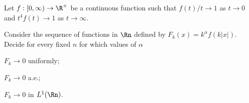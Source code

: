 Let $f:[0,\infty)\rightarrow \R^+$ be a continuous function such that
$f(t)/t\rightarrow 1$ as $t\rightarrow 0$ and $t^4f(t)\rightarrow 1$
as $t\rightarrow \infty$. 

Consider the sequence of functions in $\Rn$ defined by
$F_k(x)=k^{\alpha}f(k|x|)$. Decide for every fixed $n$ for which
values of $\alpha$ 
\begin{alist}
\item $F_k\rightarrow 0$ uniformly;
\item $F_k\rightarrow 0$ a.e.;
\item $F_k\rightarrow 0$ in $L^1(\Rn)$.
\end{alist}
